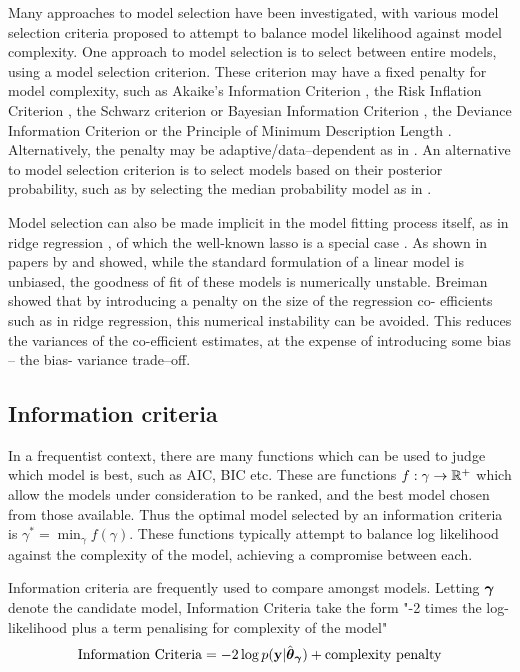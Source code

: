 Many approaches to model selection have been investigated, with various model selection criteria proposed to
attempt to balance model likelihood against model complexity. One approach to model selection is to select
between entire models, using a model selection criterion. These criterion may have a fixed penalty for model
complexity, such as Akaike's Information Criterion \citep{Akaike1974}, the Risk Inflation Criterion
\citep{Foster1994}, the Schwarz criterion or Bayesian Information Criterion \citep{Schwarz1978}, the Deviance
Information Criterion \citep{Spiegelhalter2016} or the Principle of Minimum Description Length
\citep{Hansen2001}. Alternatively, the penalty may be adaptive/data--dependent as in \citep{George2000}. An
alternative to model selection criterion is to select models based on their posterior probability, such as by
selecting the median probability model as in \citep{Barbieri2004}.

Model selection can also be made implicit in the model fitting process itself, as in ridge regression
\cite{Casella1980}, of which the well-known lasso is a special case \cite{Tibshirani1996}. As shown in
papers by \cite{Breiman1996} and \cite{Efron2013} showed, while  the standard formulation of a linear model
is unbiased, the goodness of fit of these models is numerically  unstable. Breiman showed that by introducing
a penalty on the size of the regression co- efficients such as  in ridge regression, this numerical
instability can be avoided. This reduces the variances of the co-efficient estimates, at the expense of
introducing some bias -- the bias- variance trade--off.

\subsection{Information criteria}
In a frequentist context, there are many functions which can be used to judge which model is best, such as
AIC, BIC etc. These are functions $f: \gamma \to {\mathbb{R}}^+$ which allow the models under consideration to be
ranked, and the best model chosen from those available. Thus the optimal model selected by an information
criteria is $\gamma^* = \min_\gamma f(\gamma)$. These functions typically attempt to balance log likelihood
against the complexity of the model, achieving a compromise between each.


Information criteria are frequently used to compare amongst models. Letting ${\boldsymbol \gamma}$ denote the candidate model,
Information Criteria take the form "-2 times the log-likelihood plus a term penalising for complexity of
the model"
\[
	\text{Information Criteria} = -2 \log p({\bf y} | \hat{{\boldsymbol \theta}}_{\boldsymbol \gamma}) + \text{complexity penalty}
\]

